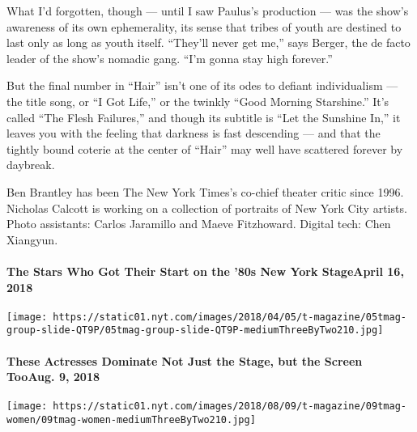 What I'd forgotten, though --- until I saw Paulus's production --- was
the show's awareness of its own ephemerality, its sense that tribes of
youth are destined to last only as long as youth itself. ``They'll never
get me,'' says Berger, the de facto leader of the show's nomadic gang.
``I'm gonna stay high forever.''

But the final number in ``Hair'' isn't one of its odes to defiant
individualism --- the title song, or ``I Got Life,'' or the twinkly
``Good Morning Starshine.'' It's called ``The Flesh Failures,'' and
though its subtitle is ``Let the Sunshine In,'' it leaves you with the
feeling that darkness is fast descending --- and that the tightly bound
coterie at the center of ``Hair'' may well have scattered forever by
daybreak.

Ben Brantley has been The New York Times's co-chief theater critic since
1996. Nicholas Calcott is working on a collection of portraits of New
York City artists. Photo assistants: Carlos Jaramillo and Maeve
Fitzhoward. Digital tech: Chen Xiangyun.

\href{https://www.nytimes.com/2018/04/16/t-magazine/broadway-1980s-actors-sarah-jessica-parker-willem-dafoe.html}{}

\hypertarget{the-stars-who-got-their-start-on-the-80s-new-york-stageapril-16-2018}{%
\paragraph{The Stars Who Got Their Start on the '80s New York StageApril
16,
2018}\label{the-stars-who-got-their-start-on-the-80s-new-york-stageapril-16-2018}}

\texttt{[image: https://static01.nyt.com/images/2018/04/05/t-magazine/05tmag-group-slide-QT9P/05tmag-group-slide-QT9P-mediumThreeByTwo210.jpg]}
\href{https://www.nytimes.com/2018/08/09/t-magazine/allison-janney-idina-menzel-female-actresses.html}{}

\hypertarget{these-actresses-dominate-not-just-the-stage-but-the-screen-tooaug-9-2018}{%
\paragraph{These Actresses Dominate Not Just the Stage, but the Screen
TooAug. 9,
2018}\label{these-actresses-dominate-not-just-the-stage-but-the-screen-tooaug-9-2018}}

\texttt{[image: https://static01.nyt.com/images/2018/08/09/t-magazine/09tmag-women/09tmag-women-mediumThreeByTwo210.jpg]}

